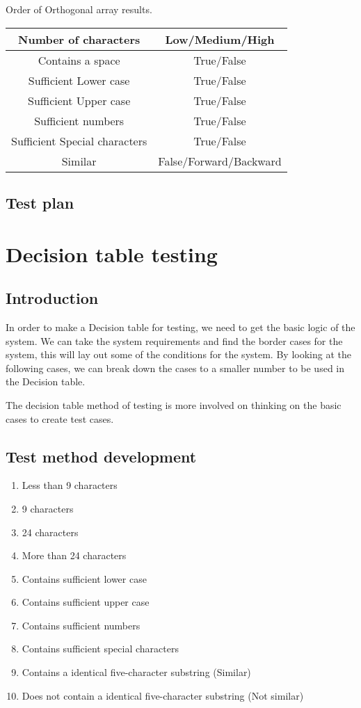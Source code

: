 \documentclass[12pt,letterpaper]{article}
\begin{document}
\centering Order of Orthogonal array results.
\begin{center}  
  \begin{tabular}{||c|c||}
  \hline
  Number of characters & Low/Medium/High \\
  \hline
  Contains a space & True/False \\
  \hline
  Sufficient Lower case & True/False \\
  \hline
  Sufficient Upper case& True/False \\
  \hline
  Sufficient numbers & True/False \\
  \hline
  Sufficient Special characters & True/False \\
  Similar & False/Forward/Backward \\
  \hline
  \end{tabular}
\end{center}


\subsection{Test plan}


\section{Decision table testing}

\subsection{Introduction}

In order to make a Decision table for testing, we need to get the basic logic of the system.
We can take the system requirements and find the border cases for the system, this will lay
out some of the conditions for the system. By looking at the following cases, we
can break down the cases to a smaller number to be used in the Decision table.

The decision table method of testing is more involved on thinking on the basic cases to create
test cases.

\subsection{Test method development}

\begin{enumerate}
\item Less than 9 characters
\item 9 characters
\item 24 characters
\item More than 24 characters
\item Contains sufficient lower case
\item Contains sufficient upper case
\item Contains sufficient numbers
\item Contains sufficient special characters
\item Contains a identical five-character substring (Similar)
\item Does not contain a identical five-character substring (Not similar)
\end{enumerate}
\end{document}

